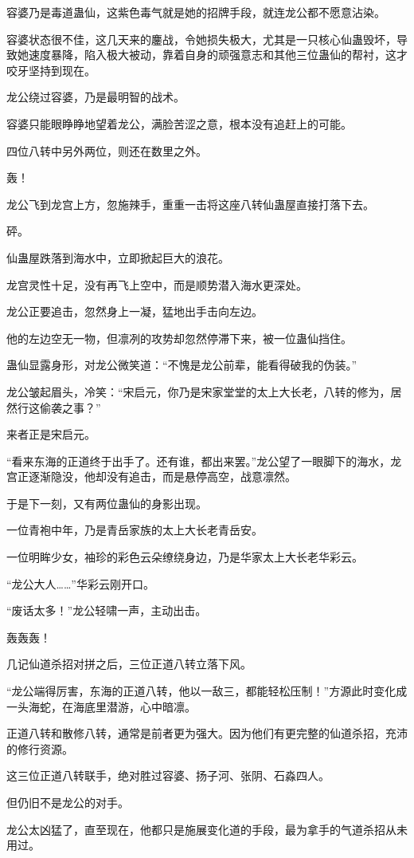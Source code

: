 \begin{this_body}
容婆乃是毒道蛊仙，这紫色毒气就是她的招牌手段，就连龙公都不愿意沾染。

容婆状态很不佳，这几天来的鏖战，令她损失极大，尤其是一只核心仙蛊毁坏，导致她速度暴降，陷入极大被动，靠着自身的顽强意志和其他三位蛊仙的帮衬，这才咬牙坚持到现在。

龙公绕过容婆，乃是最明智的战术。

容婆只能眼睁睁地望着龙公，满脸苦涩之意，根本没有追赶上的可能。

四位八转中另外两位，则还在数里之外。

轰！

龙公飞到龙宫上方，忽施辣手，重重一击将这座八转仙蛊屋直接打落下去。

砰。

仙蛊屋跌落到海水中，立即掀起巨大的浪花。

龙宫灵性十足，没有再飞上空中，而是顺势潜入海水更深处。

龙公正要追击，忽然身上一凝，猛地出手击向左边。

他的左边空无一物，但凛冽的攻势却忽然停滞下来，被一位蛊仙挡住。

蛊仙显露身形，对龙公微笑道：“不愧是龙公前辈，能看得破我的伪装。”

龙公皱起眉头，冷笑：“宋启元，你乃是宋家堂堂的太上大长老，八转的修为，居然行这偷袭之事？”

来者正是宋启元。

“看来东海的正道终于出手了。还有谁，都出来罢。”龙公望了一眼脚下的海水，龙宫正逐渐隐没，他却没有追击，而是悬停高空，战意凛然。

于是下一刻，又有两位蛊仙的身影出现。

一位青袍中年，乃是青岳家族的太上大长老青岳安。

一位明眸少女，袖珍的彩色云朵缭绕身边，乃是华家太上大长老华彩云。

“龙公大人……”华彩云刚开口。

“废话太多！”龙公轻啸一声，主动出击。

轰轰轰！

几记仙道杀招对拼之后，三位正道八转立落下风。

“龙公端得厉害，东海的正道八转，他以一敌三，都能轻松压制！”方源此时变化成一头海蛇，在海底里潜游，心中暗凛。

正道八转和散修八转，通常是前者更为强大。因为他们有更完整的仙道杀招，充沛的修行资源。

这三位正道八转联手，绝对胜过容婆、扬子河、张阴、石淼四人。

但仍旧不是龙公的对手。

龙公太凶猛了，直至现在，他都只是施展变化道的手段，最为拿手的气道杀招从未用过。


\end{this_body}
